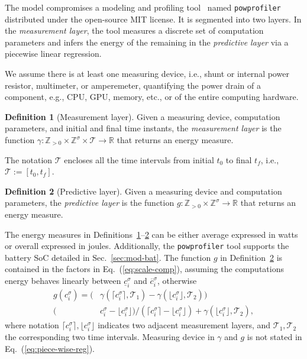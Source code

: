 \documentclass[letterpaper,10pt,conference,twoside]{IEEEtran}
\newcommand{\stt}[1]{{\small\tt #1}} %
\newcommand{\powprof}{\stt{powprofiler}}
\theoremstyle{definition}
\newtheorem{defn}{Definition}[section]
\begin{document}
The model compromises a %
modeling and profiling tool~\cite{seewald2019coarse} named \powprof{} distributed %
under the open-source MIT license. It is segmented into two layers. In the \emph{measurement layer}, the tool measures a discrete set of computation parameters and infers the energy of the remaining in the \emph{predictive layer} via a piecewise linear regression.

We assume there is at least one measuring device, i.e., shunt or internal power resistor, multimeter, or amperemeter, quantifying the power drain of a %
component, e.g., CPU, GPU, memory, etc., or of the entire computing hardware.

\begin{defn}[Measurement layer]\label{def:meas}
  Given a measuring device, computation parameters, and initial and final time instants, the \emph{measurement layer} is the function $\gamma:\mathbb{Z}_{>0}\times\mathbb{Z}^\sigma\times\mathcal{T}\rightarrow\mathbb{R}$ that returns an energy measure.
\end{defn}

The notation $\mathcal{T}$ encloses all the time intervals from initial $t_0$ to final $t_f$, i.e., $\mathcal{T}:=[t_0,t_f]$.

\begin{defn}[Predictive layer]\label{def:pred}
  Given a measuring device and computation parameters, the \emph{predictive layer} is the function $g:\mathbb{Z}_{>0}\times\mathbb{Z}^\sigma\rightarrow\mathbb{R}$ that returns an energy measure.
\end{defn}

The energy measures in Definitions~\ref{def:meas}--\hyperref[def:pred]{2} can be either average expressed in watts or overall expressed in joules. Additionally, the \powprof{} tool supports the battery SoC detailed in Sec.~\ref{sec:mod-bat}. The function $g$ in Definition~\ref{def:pred} is contained in the %
factors in Eq.~(\ref{eq:scale-comp}), assuming the computations energy behaves linearly between $\underline{c}_i^\sigma$ and $\overline{c}_i^\sigma$, otherwise
\begin{equation}%
  \label{eq:piece-wise-reg}\begin{split}
  g(c_i^\sigma)=(&\gamma(\lceil c_i^\sigma\rceil,\mathcal{T}_1)-\gamma(\lfloor c_i^\sigma\rfloor,\mathcal{T}_2))\\(&c_i^\sigma-\lfloor c_i^\sigma\rfloor)/(\lceil c_i^\sigma\rceil-\lfloor c_i^\sigma\rfloor)+\gamma(\lfloor c_i^\sigma\rfloor,\mathcal{T}_2),
\end{split}\end{equation}
where notation $\lceil c_i^\sigma\rceil,\lfloor c_i^\sigma\rfloor$ indicates two adjacent measurement layers, and $\mathcal{T}_1,\mathcal{T}_2$ %
the corresponding two time intervals. {\color{black}M}easuring device in $\gamma$ and $g$ is {\color{black}not %
stated in Eq.~(\ref{eq:piece-wise-reg})}.
\end{document}
